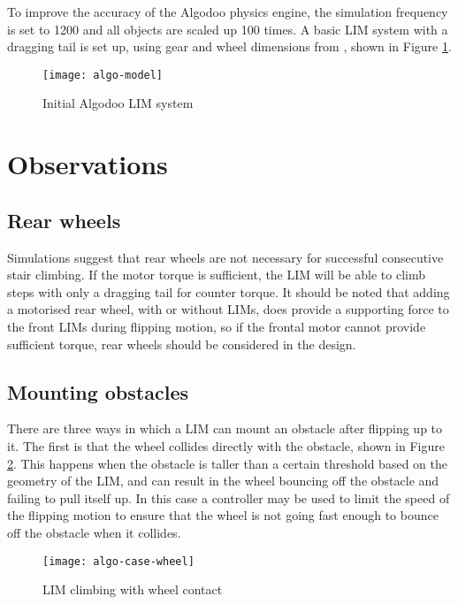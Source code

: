 To improve the accuracy of the Algodoo physics engine, the simulation frequency is set to 1200 and all objects are scaled up 100 times. A basic LIM system with a dragging tail is set up, using gear and wheel dimensions from \cite{Powrie-2019}, shown in Figure \ref{algo-model}.

\begin{figure}[h]
	\centering
	\texttt{[image: algo-model]}
	\caption{Initial Algodoo LIM system}
	\label{algo-model}
\end{figure}
\section{Observations}

\subsection{Rear wheels}

Simulations suggest that rear wheels are not necessary for successful consecutive stair climbing. If the motor torque is sufficient, the LIM will be able to climb steps with only a dragging tail for counter torque. It should be noted that adding a motorised rear wheel, with or without LIMs, does provide a supporting force to the front LIMs during flipping motion, so if the frontal motor cannot provide sufficient torque, rear wheels should be considered in the design.

\subsection{Mounting obstacles}

There are three ways in which a LIM can mount an obstacle after flipping up to it. The first is that the wheel collides directly with the obstacle, shown in Figure \ref{algo-case-wheel}. This happens when the obstacle is taller than a certain threshold based on the geometry of the LIM, and can result in the wheel bouncing off the obstacle and failing to pull itself up. In this case a controller may be used to limit the speed of the flipping motion to ensure that the wheel is not going fast enough to bounce off the obstacle when it collides. \\

\begin{figure}[h]
	\centering
	\texttt{[image: algo-case-wheel]}
	\caption{LIM climbing with wheel contact}
	\label{algo-case-wheel}
\end{figure}

